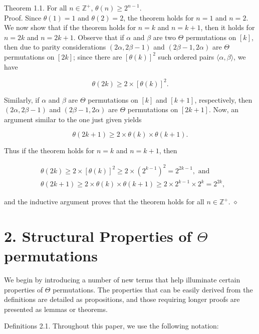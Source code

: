 \documentclass[10pt]{article}
\newcommand{\proofend}{\hfill\(\diamond\)}
\begin{document}
Theorem 1.1. For all $n \in \mathbb{Z}^{+}$, $\theta(n) \geq 2^{n-1}$.\\
Proof. Since $\theta(1)=1$ and $\theta(2)=2$, the theorem holds for $n=1$ and $n=2$. We now show that if the theorem holds for $n=k$ and $n=k+1$, then it holds for $n=2 k$ and $n=2 k+1$. Observe that if $\alpha$ and $\beta$ are two $\Theta$ permutations on $[k]$, then due to parity considerations $(2 \alpha, 2 \beta-1)$ and $(2 \beta-1,2 \alpha)$ are $\Theta$ permutations on $[2 k]$; since there are $[\theta(k)]^{2}$ such ordered pairs $\langle\alpha, \beta\rangle$, we have


\begin{equation*}
\theta(2 k) \geq 2 \times[\theta(k)]^{2} . \tag{1}
\end{equation*}


Similarly, if $\alpha$ and $\beta$ are $\Theta$ permutations on $[k]$ and $[k+1]$, respectively, then $(2 \alpha, 2 \beta-1)$ and $(2 \beta-1,2 \alpha)$ are $\Theta$ permutations on $[2 k+1]$. Now, an argument similar to the one just given yields


\begin{equation*}
\theta(2 k+1) \geq 2 \times \theta(k) \times \theta(k+1) . \tag{2}
\end{equation*}


Thus if the theorem holds for $n=k$ and $n=k+1$, then

$$
\begin{aligned}
& \theta(2 k) \geq 2 \times[\theta(k)]^{2} \geq 2 \times\left(2^{k-1}\right)^{2}=2^{2 k-1}, \text { and } \\
& \theta(2 k+1) \geq 2 \times \theta(k) \times \theta(k+1) \geq 2 \times 2^{k-1} \times 2^{k}=2^{2 k},
\end{aligned}
$$

and the inductive argument proves that the theorem holds for all $n \in \mathbb{Z}^{+}$. \proofend

\section*{2. Structural Properties of $\Theta$ permutations}
We begin by introducing a number of new terms that help illuminate certain properties of $\Theta$ permutations. The properties that can be easily derived from the definitions are detailed as propositions, and those requiring longer proofs are presented as lemmas or theorems.

Definitions 2.1. Throughout this paper, we use the following notation:
\end{document}
